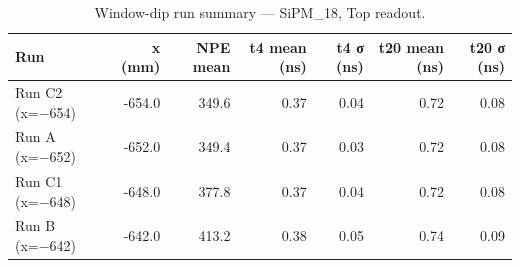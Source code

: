\begin{table}[htbp]
\centering
\small
\caption{Window-dip run summary — SiPM\_18, Top readout.}
\label{tab:window_dip}
\begin{tabular}{lrrrrrr}
\toprule
\textbf{Run} & \textbf{x (mm)} & \textbf{NPE mean} & \textbf{t4 mean (ns)} & \textbf{t4 σ (ns)} & \textbf{t20 mean (ns)} & \textbf{t20 σ (ns)} \\
\midrule
Run C2 (x=−654) & -654.0 & 349.6 & 0.37 & 0.04 & 0.72 & 0.08 \\
Run A (x=−652) & -652.0 & 349.4 & 0.37 & 0.03 & 0.72 & 0.08 \\
Run C1 (x=−648) & -648.0 & 377.8 & 0.37 & 0.04 & 0.72 & 0.08 \\
Run B (x=−642) & -642.0 & 413.2 & 0.38 & 0.05 & 0.74 & 0.09 \\
\bottomrule
\end{tabular}
\end{table}

